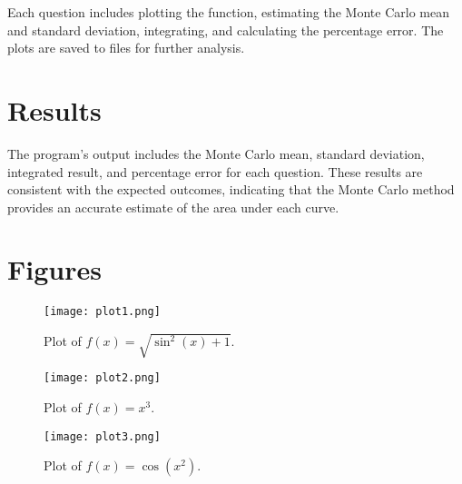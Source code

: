 \documentclass{article}
\begin{document}
Each question includes plotting the function, estimating the Monte Carlo mean and standard deviation, integrating, and calculating the percentage error. The plots are saved to files for further analysis.

\section*{Results}
The program's output includes the Monte Carlo mean, standard deviation, integrated result, and percentage error for each question. These results are consistent with the expected outcomes, indicating that the Monte Carlo method provides an accurate estimate of the area under each curve.


\section*{Figures}

\begin{figure}[htbp]
    \centering
    \texttt{[image: plot1.png]} %
    \caption{Plot of \(f(x) = \sqrt{\sin^2(x) + 1}\).}
\end{figure}

\begin{figure}[htbp]
    \centering
    \texttt{[image: plot2.png]} %
    \caption{Plot of \(f(x) = x^3\).}
\end{figure}

\begin{figure}[htbp]
    \centering
    \texttt{[image: plot3.png]} %
    \caption{Plot of \(f(x) = \cos(x^2)\).}
\end{figure}
\end{document}
